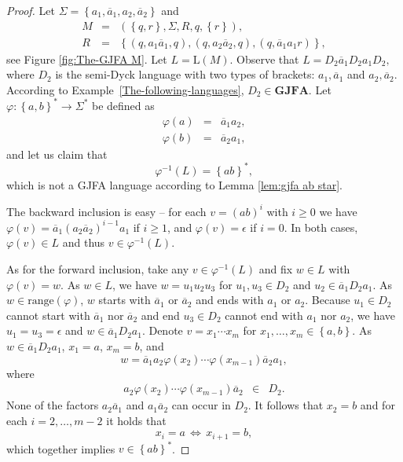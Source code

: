 \documentclass{ws-ijmpc}
\begin{document}
\begin{proof}
Let $\Sigma=\left\{ a_{1},\overline{a}_{1},a_{2},\overline{a}_{2}\right\} $
and 
\begin{eqnarray*}
M & = & \left(\left\{ q,r\right\} ,\Sigma,R,q,\left\{ r\right\} \right),\\
R & = & \left\{ \left(q,a_{1}\overline{a}_{1},q\right),\left(q,a_{2}\overline{a}_{2},q\right),\left(q,\overline{a}_{1}a_{1}r\right)\right\} ,
\end{eqnarray*}
see Figure \ref{fig:The-GJFA M}. Let $L=\mathrm{L}\!\left(M\right)$.
Observe that $L=D_{2}\overline{a}_{1}D_{2}a_{1}D_{2},$ where $D_{2}$
is the semi-Dyck language with two types of brackets: $a_{1},\overline{a}_{1}$
and $a_{2},\overline{a}_{2}$. According to Example~\ref{The-following-languages},
$D_{2}\in\mathbf{GJFA}$. Let $\varphi:\left\{ a,b\right\} ^{*}\rightarrow\Sigma^{*}$
be defined as
\begin{eqnarray*}
\varphi\!\left(a\right) & = & \overline{a}_{1}a_{2},\\
\varphi\!\left(b\right) & = & \overline{a}_{2}a_{1},
\end{eqnarray*}
and let us claim that 
\[
\varphi^{-1}\!\left(L\right)=\left\{ ab\right\} ^{*},
\]
which is not a GJFA language according to Lemma \ref{lem:gjfa ab star}.

The backward inclusion is easy -- for each $v=\left(ab\right)^{i}$
with $i\ge0$ we have $\varphi\!\left(v\right)=\overline{a}_{1}\left(a_{2}\overline{a}_{2}\right)^{i-1}a_{1}$
if $i\ge1$, and $\varphi\!\left(v\right)=\epsilon$ if $i=0$. In
both cases, $\varphi\!\left(v\right)\in L$ and thus $v\in\varphi^{-1}\!\left(L\right)$. 

As for the forward inclusion, take any $v\in\varphi^{-1}\!\left(L\right)$
and fix $w\in L$ with $\varphi\!\left(v\right)=w$. As $w\in L$,
we have $w=u_{1}u_{2}u_{3}$ for $u_{1},u_{3}\in D_{2}$ and $u_{2}\in\overline{a}_{1}D_{2}a_{1}$.
As $w\in\mathrm{range}\!\left(\varphi\right)$, $w$ starts with $\overline{a}_{1}$
or $\overline{a}_{2}$ and ends with $a_{1}$ or $a_{2}$. Because
$u_{1}\in D_{2}$ cannot start with $\overline{a}_{1}$ nor $\overline{a}_{2}$
and end $u_{3}\in D_{2}$ cannot end with $a_{1}$ nor $a_{2}$, we
have $u_{1}=u_{3}=\epsilon$ and $w\in\overline{a}_{1}D_{2}a_{1}$.
Denote $v=x_{1}\cdots x_{m}$ for $x_{1},\dots,x_{m}\in\left\{ a,b\right\} $.
As $w\in\overline{a}_{1}D_{2}a_{1}$, $x_{1}=a$, $x_{m}=b$, and
\[
w=\overline{a}_{1}a_{2}\varphi\!\left(x_{2}\right)\cdots\varphi\!\left(x_{m-1}\right)\overline{a}_{2}a_{1},
\]
where
\begin{eqnarray*}
a_{2}\varphi\!\left(x_{2}\right)\cdots\varphi\!\left(x_{m-1}\right)\overline{a}_{2} & \in & D_{2}.
\end{eqnarray*}
None of the factors $a_{2}\overline{a}_{1}$ and $a_{1}\overline{a}_{2}$
can occur in $D_{2}$. It follows that $x_{2}=b$ and for each $i=2,\dots,m-2$
it holds that 
\[
x_{i}=a\,\Leftrightarrow\, x_{i+1}=b,
\]
which together implies $v\in\left\{ ab\right\} ^{*}$.
\end{proof}
\end{document}
